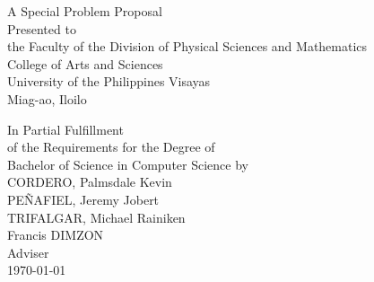 \begin{titlepage}
\centering


\vspace{1.75cm}
A Special Problem Proposal\\
Presented to\\
the Faculty of the Division of Physical Sciences and Mathematics\\
College of Arts and Sciences\\
University of the Philippines Visayas\\
Miag-ao, Iloilo

\vspace{1.75cm}
In Partial Fulfillment\\
of the Requirements for the Degree of\\
Bachelor of Science in Computer Science
\vspace{1.75cm}
by\\

\vspace{1cm}
CORDERO, Palmsdale Kevin  \\
PEÑAFIEL, Jeremy Jobert  \\
TRIFALGAR, Michael Rainiken  \\

\vspace{1.75cm}
Francis DIMZON \\
Adviser\\

\vspace{1.75cm}
\today
\end{titlepage}
